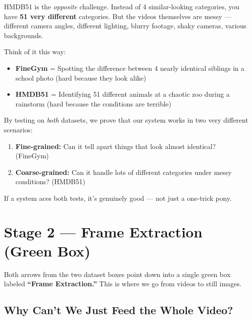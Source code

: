 \documentclass[12pt, a4paper]{article}
\begin{document}
\begin{analogybox}
HMDB51 is the \textit{opposite} challenge. Instead of 4 similar-looking categories, you have \textbf{51 very different} categories. But the videos themselves are messy — different camera angles, different lighting, blurry footage, shaky cameras, various backgrounds. 

Think of it this way:
\begin{itemize}
    \item \textbf{FineGym} = Spotting the difference between 4 nearly identical siblings in a school photo (hard because they look alike)
    \item \textbf{HMDB51} = Identifying 51 different animals at a chaotic zoo during a rainstorm (hard because the conditions are terrible)
\end{itemize}
\end{analogybox}

\begin{summarybox}
By testing on \textit{both} datasets, we prove that our system works in two very different scenarios:
\begin{enumerate}
    \item \textbf{Fine-grained:} Can it tell apart things that look almost identical? (FineGym)
    \item \textbf{Coarse-grained:} Can it handle lots of different categories under messy conditions? (HMDB51)
\end{enumerate}
If a system aces both tests, it's genuinely good — not just a one-trick pony.
\end{summarybox}

\newpage
\section{Stage 2 — Frame Extraction (Green Box)}

Both arrows from the two dataset boxes point down into a single green box labeled \textbf{``Frame Extraction.''} This is where we go from videos to still images.

\subsection{Why Can't We Just Feed the Whole Video?}
\end{document}
